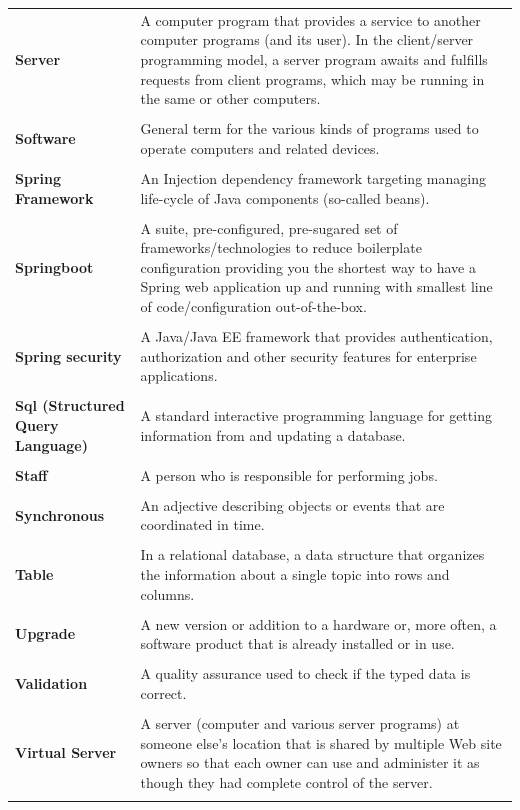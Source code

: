 \documentclass[a4paper,11pt,twoside]{report}
\theoremstyle{definition}
\begin{document}
\begin{longtable}{p{4cm} p{11cm}}
\textbf{Server} & A computer program that provides a service to another computer programs (and its user). In the client/server programming model, a server program awaits and fulfills requests from client programs, which may be running in the same or other computers.\\ \\
\textbf{Software} & General term for the various kinds of programs used to operate computers and related devices.\\ \\
\textbf{Spring Framework} & An Injection dependency framework targeting managing life-cycle of Java components (so-called beans). \\ \\
\textbf{Springboot} & A suite, pre-configured, pre-sugared set of frameworks/technologies to reduce boilerplate configuration providing you the shortest way to have a Spring web application up and running with smallest line of code/configuration out-of-the-box. \\ \\
\textbf{Spring security} & A Java/Java EE framework that provides authentication, authorization and other security features for enterprise applications.\\ \\
\textbf{Sql (Structured Query Language)} & A standard interactive programming language for getting information from and updating a database.\\ \\
\textbf{Staff} & A person who is responsible for performing jobs.\\ \\
\textbf{Synchronous} & An adjective describing objects or events that are coordinated in time.\\ \\
\textbf{Table} & In a relational database, a data structure that organizes the information about a single topic into rows and columns.\\ \\
\textbf{Upgrade} & A new version or addition to a hardware or, more often, a software product that is already installed or in use.\\ \\
\textbf{Validation} & A quality assurance used to check if the typed data is correct.\\ \\
\textbf{Virtual Server} & A server (computer and various server programs) at someone else's location that is shared by multiple Web site owners so that each owner can use and administer it as though they had complete control of the server.\\ \\

\end{longtable}
\end{document}

